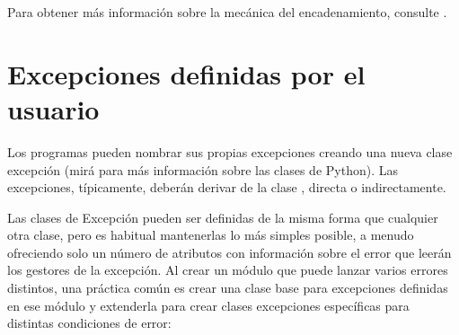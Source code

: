 \documentclass[a4,10pt,spanish]{sphinxmanual}
\begin{document}
\sphinxAtStartPar
Para obtener más información sobre la mecánica del encadenamiento, consulte .


\section{Excepciones definidas por el usuario}
\label{\detokenize{tutorial/errors:user-defined-exceptions}}\label{\detokenize{tutorial/errors:tut-userexceptions}}
\sphinxAtStartPar
Los programas pueden nombrar sus propias excepciones creando una nueva clase excepción (mirá {\hyperref[\detokenize{tutorial/classes:tut-classes}]{}} para más información sobre las clases de Python).  Las excepciones, típicamente, deberán derivar de la clase , directa o indirectamente.

\sphinxAtStartPar
Las clases de Excepción pueden ser definidas de la misma forma que cualquier otra clase, pero es habitual mantenerlas lo más simples posible, a menudo ofreciendo solo un número de atributos con información sobre el error que leerán los gestores de la excepción.  Al crear un módulo que puede lanzar varios errores distintos, una práctica común es crear una clase base para excepciones definidas en ese módulo y extenderla para crear clases excepciones específicas para distintas condiciones de error:
\end{document}
